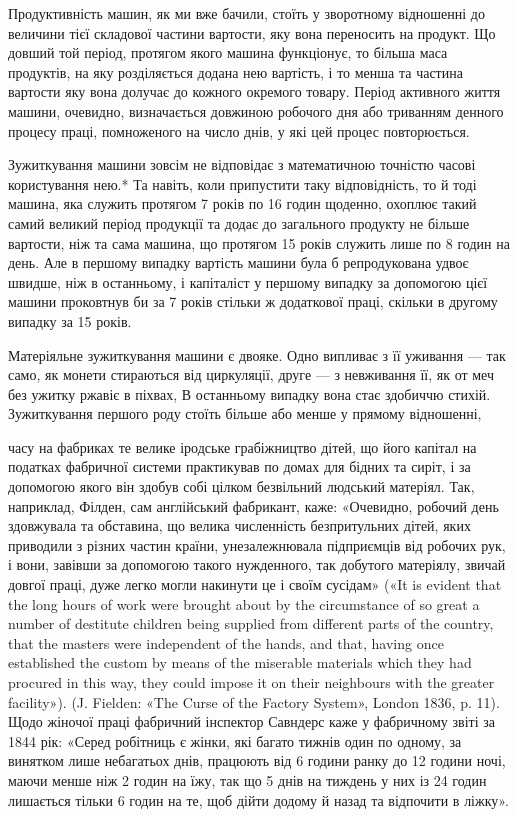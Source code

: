 Продуктивність машин, як ми вже бачили, стоїть у зворотному
відношенні до величини тієї складової частини вартости, яку вона
переносить на продукт. Що довший той період, протягом якого
машина функціонує, то більша маса продуктів, на яку розділяється
додана нею вартість, і то менша та частина вартости
яку вона долучає до кожного окремого товару. Період активного
життя машини, очевидно, визначається довжиною робочого дня
або триванням денного процесу праці, помноженого на число
днів, у які цей процес повторюється.

Зужиткування машини зовсім не відповідає з математичною
точністю часові користування нею.* Та навіть, коли припустити
таку відповідність, то й тоді машина, яка служить протягом
7 років по 16 годин щоденно, охоплює такий самий великий
період продукції та додає до загального продукту не більше
вартости, ніж та сама машина, що протягом 15 років служить
лише по 8 годин на день. Але в першому випадку вартість машини
була б репродукована удвоє швидше, ніж в останньому, і капіталіст
у першому випадку за допомогою цієї машини проковтнув би
за 7  років стільки ж додаткової праці, скільки в другому випадку
за 15 років.

Матеріяльне зужиткування машини є двояке. Одно випливає
з її уживання — так само, як монети стираються від циркуляції,
друге — з невживання її, як от меч без ужитку ржавіє в піхвах,
В останньому випадку вона стає здобиччю стихій. Зужиткування
першого роду стоїть більше або менше у прямому відношенні,

часу на фабриках те велике іродське грабіжництво дітей, що його капітал
на податках фабричної системи практикував по домах для бідних та
сиріт, і за допомогою якого він здобув собі цілком безвільний людський
матеріял. Так, наприклад, Філден, сам англійський фабрикант, каже:
«Очевидно, робочий день здовжувала та обставина, що велика численність
безпритульних дітей, яких приводили з різних частин країни, унезалежнювала
підприємців від робочих рук, і вони, завівши за допомогою такого
нужденного, так добутого матеріялу, звичай довгої праці, дуже легко
могли накинути це і своїм сусідам» («It is evident that the long hours of
work were brought about by the circumstance of so great a number of destitute
children being supplied from different parts of the country, that the
masters were independent of the hands, and that, having once established
the custom by means of the miserable materials which they had procured in
this way, they could impose it on their neighbours with the greater facility»).
(J. Fielden: «The Curse of the Factory System», London 1836, p. 11).
Щодо жіночої праці фабричний інспектор Савндерс каже у фабричному
звіті за 1844 рік: «Серед робітниць є жінки, які багато тижнів один по
одному, за винятком лише небагатьох днів, працюють від 6 години ранку
до 12 години ночі, маючи менше ніж 2 годин на їжу, так що 5 днів на тиждень
у них із 24 годин лишається тільки 6 годин на те, щоб дійти додому
й назад та відпочити в ліжку».

